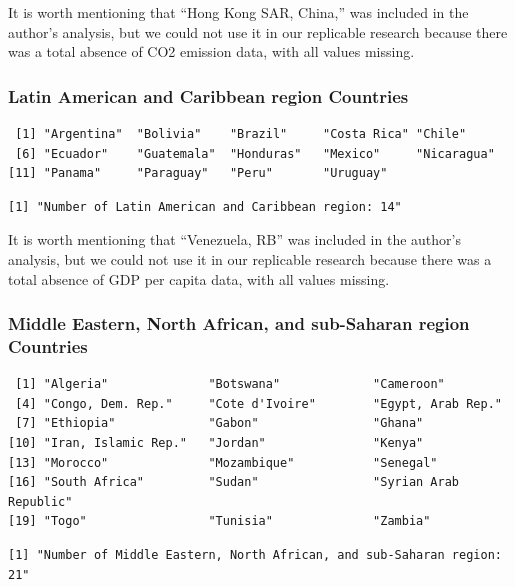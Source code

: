 \documentclass[
  11pt,
]{article}
\begin{document}
It is worth mentioning that ``Hong Kong SAR, China,'' was included in
the author's analysis, but we could not use it in our replicable
research because there was a total absence of CO2 emission data, with
all values missing.

\hypertarget{latin-american-and-caribbean-region-countries}{%
\subsubsection{Latin American and Caribbean region
Countries}\label{latin-american-and-caribbean-region-countries}}

\begin{verbatim}
 [1] "Argentina"  "Bolivia"    "Brazil"     "Costa Rica" "Chile"     
 [6] "Ecuador"    "Guatemala"  "Honduras"   "Mexico"     "Nicaragua" 
[11] "Panama"     "Paraguay"   "Peru"       "Uruguay"   
\end{verbatim}

\begin{verbatim}
[1] "Number of Latin American and Caribbean region: 14"
\end{verbatim}

It is worth mentioning that ``Venezuela, RB'' was included in the
author's analysis, but we could not use it in our replicable research
because there was a total absence of GDP per capita data, with all
values missing.

\hypertarget{middle-eastern-north-african-and-sub-saharan-region-countries}{%
\subsubsection{Middle Eastern, North African, and sub-Saharan region
Countries}\label{middle-eastern-north-african-and-sub-saharan-region-countries}}

\begin{verbatim}
 [1] "Algeria"              "Botswana"             "Cameroon"            
 [4] "Congo, Dem. Rep."     "Cote d'Ivoire"        "Egypt, Arab Rep."    
 [7] "Ethiopia"             "Gabon"                "Ghana"               
[10] "Iran, Islamic Rep."   "Jordan"               "Kenya"               
[13] "Morocco"              "Mozambique"           "Senegal"             
[16] "South Africa"         "Sudan"                "Syrian Arab Republic"
[19] "Togo"                 "Tunisia"              "Zambia"              
\end{verbatim}

\begin{verbatim}
[1] "Number of Middle Eastern, North African, and sub-Saharan region: 21"
\end{verbatim}
\end{document}
